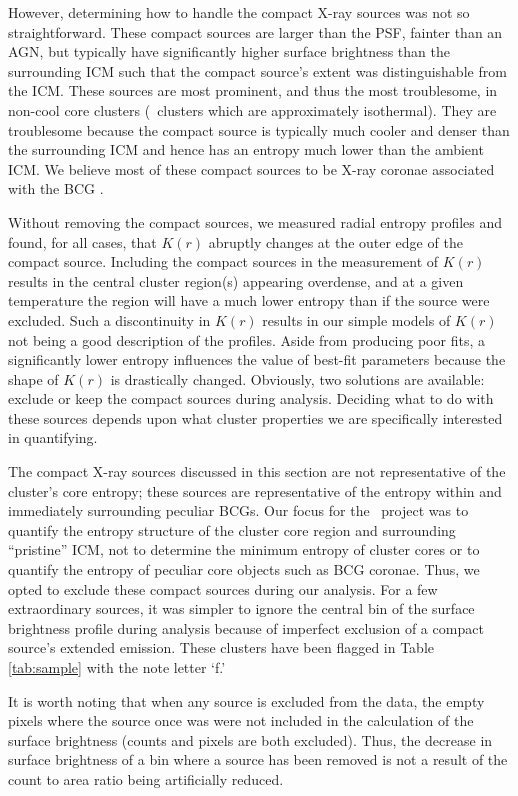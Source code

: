 \documentclass{emulateapj}
\begin{document}
However, determining how to handle the compact X-ray sources was not
so straightforward. These compact sources are larger than the PSF,
fainter than an AGN, but typically have significantly higher surface
brightness than the surrounding ICM such that the compact source's
extent was distinguishable from the ICM. These sources are most
prominent, and thus the most troublesome, in non-cool core clusters
(\ie\ clusters which are approximately isothermal). They are
troublesome because the compact source is typically much cooler and
denser than the surrounding ICM and hence has an entropy much lower
than the ambient ICM. We believe most of these compact sources to be
X-ray coronae associated with the BCG \citep[see][for discussion of
  BCG coronae]{coronae}.

Without removing the compact sources, we measured radial entropy
profiles and found, for all cases, that $K(r)$ abruptly changes at the
outer edge of the compact source. Including the compact sources in the
measurement of $K(r)$ results in the central cluster region(s)
appearing overdense, and at a given temperature the region will have a
much lower entropy than if the source were excluded. Such a
discontinuity in $K(r)$ results in our simple models of $K(r)$ not
being a good description of the profiles. Aside from producing poor
fits, a significantly lower entropy influences the value of best-fit
parameters because the shape of $K(r)$ is drastically
changed. Obviously, two solutions are available: exclude or keep the
compact sources during analysis.  Deciding what to do with these
sources depends upon what cluster properties we are specifically
interested in quantifying.

The compact X-ray sources discussed in this section are not
representative of the cluster's core entropy; these sources are
representative of the entropy within and immediately surrounding
peculiar BCGs. Our focus for the \accept\ project was to quantify the
entropy structure of the cluster core region and surrounding
``pristine'' ICM, not to determine the minimum entropy of cluster
cores or to quantify the entropy of peculiar core objects such as BCG
coronae. Thus, we opted to exclude these compact sources during our
analysis. For a few extraordinary sources, it was simpler to ignore
the central bin of the surface brightness profile during analysis
because of imperfect exclusion of a compact source's extended
emission. These clusters have been flagged in Table \ref{tab:sample}
with the note letter `f.'

It is worth noting that when any source is excluded from the data, the
empty pixels where the source once was were not included in the
calculation of the surface brightness (counts and pixels are both
excluded). Thus, the decrease in surface brightness of a bin where a
source has been removed is not a result of the count to area ratio
being artificially reduced.
\end{document}
